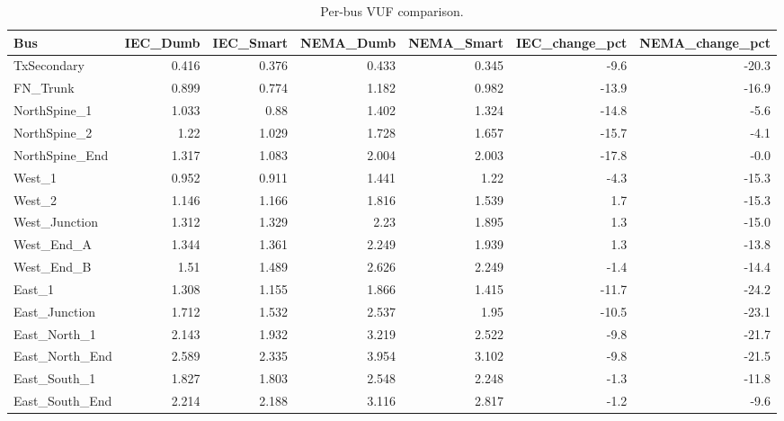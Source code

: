 \begin{table}[h]
\centering
\caption{Per-bus VUF comparison.}
\label{tab:per-bus-vuf}
\begin{tabular}{lrrrrrr}
\toprule
Bus & IEC_Dumb & IEC_Smart & NEMA_Dumb & NEMA_Smart & IEC_change_pct & NEMA_change_pct \\
\midrule
TxSecondary & 0.416 & 0.376 & 0.433 & 0.345 & -9.6 & -20.3 \\
FN_Trunk & 0.899 & 0.774 & 1.182 & 0.982 & -13.9 & -16.9 \\
NorthSpine_1 & 1.033 & 0.88 & 1.402 & 1.324 & -14.8 & -5.6 \\
NorthSpine_2 & 1.22 & 1.029 & 1.728 & 1.657 & -15.7 & -4.1 \\
NorthSpine_End & 1.317 & 1.083 & 2.004 & 2.003 & -17.8 & -0.0 \\
West_1 & 0.952 & 0.911 & 1.441 & 1.22 & -4.3 & -15.3 \\
West_2 & 1.146 & 1.166 & 1.816 & 1.539 & 1.7 & -15.3 \\
West_Junction & 1.312 & 1.329 & 2.23 & 1.895 & 1.3 & -15.0 \\
West_End_A & 1.344 & 1.361 & 2.249 & 1.939 & 1.3 & -13.8 \\
West_End_B & 1.51 & 1.489 & 2.626 & 2.249 & -1.4 & -14.4 \\
East_1 & 1.308 & 1.155 & 1.866 & 1.415 & -11.7 & -24.2 \\
East_Junction & 1.712 & 1.532 & 2.537 & 1.95 & -10.5 & -23.1 \\
East_North_1 & 2.143 & 1.932 & 3.219 & 2.522 & -9.8 & -21.7 \\
East_North_End & 2.589 & 2.335 & 3.954 & 3.102 & -9.8 & -21.5 \\
East_South_1 & 1.827 & 1.803 & 2.548 & 2.248 & -1.3 & -11.8 \\
East_South_End & 2.214 & 2.188 & 3.116 & 2.817 & -1.2 & -9.6 \\
\bottomrule
\end{tabular}
\end{table}
